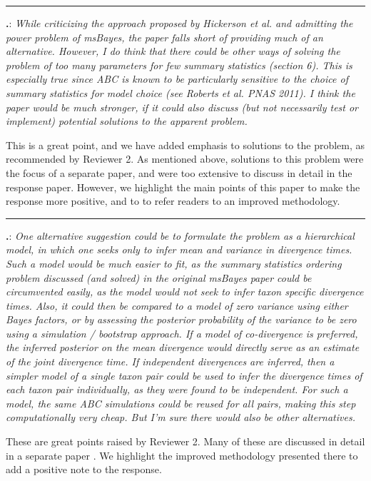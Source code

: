 \documentclass[12pt]{article}
\newcounter{commentCounter}
\newcommand{\revcomment}[1]{{\addtocounter{commentCounter}{1}}
    \medskip \hrule \noindent
\textbf{\arabic{section}.\arabic{commentCounter}}: {\sl #1}\par\xspace}
\newcommand{\response}[1]{{\addtolength{\leftskip}{0.25in} #1\par}\xspace}
\begin{document}
\revcomment{
    While criticizing the approach proposed by Hickerson et al. and admitting
    the power problem of msBayes, the paper falls short of providing much of an
    alternative. However, I do think that there could be other ways of solving
    the problem of too many parameters for few summary statistics (section 6).
    This is especially true since ABC is known to be particularly sensitive to
    the choice of summary statistics for model choice (see Roberts et al. PNAS
    2011). I think the paper would be much stronger, if it could also discuss
    (but not necessarily test or implement) potential solutions to the apparent
    problem.
}
\response{
    This is a great point, and we have added emphasis to solutions to the
    problem, as recommended by Reviewer 2. As mentioned above, solutions to
    this problem were the focus of a separate paper, and were too extensive to
    discuss in detail in the response paper. However, we highlight the main
    points of this paper to make the response more positive, and to to refer
    readers to an improved methodology.
}

\revcomment{
    One alternative suggestion could be to formulate the problem as a
    hierarchical model, in which one seeks only to infer mean and variance in
    divergence times. Such a model would be much easier to fit, as the summary
    statistics ordering problem discussed (and solved) in the original msBayes
    paper could be circumvented easily, as the model would not seek to infer
    taxon specific divergence times. Also, it could then be compared to a model
    of zero variance using either Bayes factors, or by assessing the posterior
    probability of the variance to be zero using a simulation / bootstrap
    approach. If a model of co-divergence is preferred, the inferred posterior
    on the mean divergence would directly serve as an estimate of the joint
    divergence time. If independent divergences are inferred, then a simpler
    model of a single taxon pair could be used to infer the divergence times of
    each taxon pair individually, as they were found to be independent. For
    such a model, the same ABC simulations could be reused for all pairs,
    making this step computationally very cheap. But I'm sure there would also
    be other alternatives.
}
\response{
    These are great points raised by Reviewer 2. Many of these are
    discussed in detail in a separate paper \citep{Oaks2014dpp}.
    We highlight the improved methodology presented there to add a positive
    note to the response.
}
\end{document}
